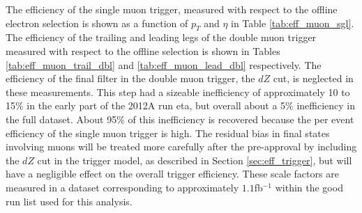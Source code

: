 %
%

The efficiency of the single muon trigger, measured
with respect to the offline electron selection is shown
as a function of $p_T$ and $\eta$ in Table \ref{tab:eff_muon_sgl}.
The efficiency of the trailing and leading legs of the double muon trigger
measured with respect to the offline selection is shown
in Tables \ref{tab:eff_muon_trail_dbl} and \ref{tab:eff_muon_lead_dbl} respectively.
The efficiency of the final filter in the double muon trigger, the $dZ$ cut,
is neglected in these measurements.  This step had a sizeable inefficiency of
approximately 10 to 15\% in the early part of the 2012A run eta, but
overall about a 5\% inefficiency in the full dataset.
About 95\% of this inefficiency is recovered
because the per event efficiency of the single muon trigger is high.
The residual bias in final states involving muons will
be treated more carefully after the pre-approval by including the $dZ$ cut in 
the trigger model, as described in Section \ref{sec:eff_trigger}, but will
have a negligible effect on the overall trigger efficiency.
These scale factors are measured in a dataset corresponding
to approximately $1.1$fb$^{-1}$ within the good run list used for this analysis.

